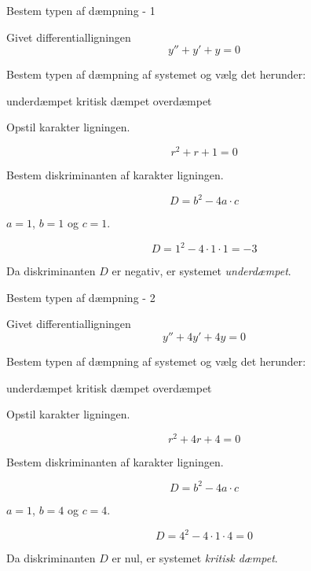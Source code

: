 \documentclass{article}
\begin{document}
\tableofcontents
\newpage

\begin{exercise}{Bestem typen af dæmpning - 1}

Givet differentialligningen
\[
y'' + y' + y = 0
\]

Bestem typen af dæmpning af systemet og vælg det herunder:
\begin{multichoice}
\itemtrue underdæmpet
\itemfalse kritisk dæmpet
\itemfalse overdæmpet
\end{multichoice}


\hint
Opstil karakter ligningen.

\hint
\[
r^2 + r + 1 = 0
\]

\hint
Bestem diskriminanten af karakter ligningen.

\hint
\[
D = b^2 - 4 a \cdot c
\]

\hint
$a = 1$, $b = 1$ og $c = 1$.

\hint
\[
D = 1^2 - 4 \cdot 1 \cdot 1 = -3
\]

\hint
Da diskriminanten $D$ er negativ, er systemet \emph{underdæmpet}.

\end{exercise}

\newpage

\begin{exercise}{Bestem typen af dæmpning - 2}

Givet differentialligningen
\[
y'' + 4 y' + 4 y = 0
\]

Bestem typen af dæmpning af systemet og vælg det herunder:
\begin{multichoice}
\itemfalse underdæmpet
\itemtrue kritisk dæmpet
\itemfalse overdæmpet
\end{multichoice}


\hint
Opstil karakter ligningen.

\hint
\[
r^2 + 4 r + 4 = 0
\]

\hint
Bestem diskriminanten af karakter ligningen.

\hint
\[
D = b^2 - 4 a \cdot c
\]

\hint
$a = 1$, $b = 4$ og $c = 4$.

\hint
\[
D = 4^2 - 4 \cdot 1 \cdot 4 = 0
\]

\hint
Da diskriminanten $D$ er nul, er systemet \emph{kritisk dæmpet}.

\end{exercise}

\newpage
\end{document}

